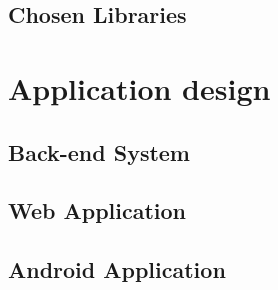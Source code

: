 \documentclass[12pt,a4paper]{article}
\begin{document}
\subsection{Chosen Libraries}
\pagebreak
\section{Application design}
\subsection{Back-end System}
\subsection{Web Application}
\subsection{Android Application}
\end{document}
